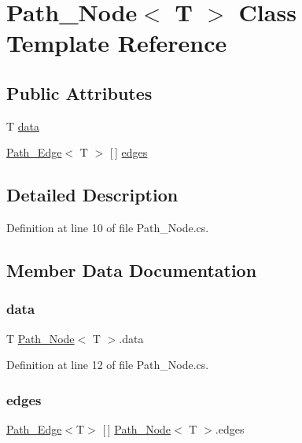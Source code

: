 \hypertarget{class_path___node}{}\section{Path\+\_\+\+Node$<$ T $>$ Class Template Reference}
\label{class_path___node}
\subsection*{Public Attributes}
\begin{DoxyCompactItemize}
\item 
T \hyperlink{class_path___node_a62dbe236ae6d5f25c80bcd104633e594}{data}
\item 
\hyperlink{class_path___edge}{Path\+\_\+\+Edge}$<$ T $>$ \mbox{[}$\,$\mbox{]} \hyperlink{class_path___node_aef85d57f3dac532f903a12899aad75d3}{edges}
\end{DoxyCompactItemize}


\subsection{Detailed Description}


Definition at line 10 of file Path\+\_\+\+Node.\+cs.



\subsection{Member Data Documentation}
\mbox{\label{class_path___node_a62dbe236ae6d5f25c80bcd104633e594}} 
\subsubsection{\texorpdfstring{data}{data}}
{\footnotesize\ttfamily T \hyperlink{class_path___node}{Path\+\_\+\+Node}$<$ T $>$.data}



Definition at line 12 of file Path\+\_\+\+Node.\+cs.

\mbox{\label{class_path___node_aef85d57f3dac532f903a12899aad75d3}} 
\subsubsection{\texorpdfstring{edges}{edges}}
{\footnotesize\ttfamily \hyperlink{class_path___edge}{Path\+\_\+\+Edge}$<$T$>$ \mbox{[}$\,$\mbox{]} \hyperlink{class_path___node}{Path\+\_\+\+Node}$<$ T $>$.edges}



